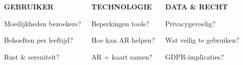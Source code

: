 \documentclass[final]{beamer}
\begin{document}
\begin{frame}[t]{}
\begin{columns}[T, totalwidth=\linewidth]
            \begin{columns}[T, totalwidth=\linewidth]
                \begin{tcolorbox}[subqbox]
                    {\small\bfseries\color{hogentred}\MakeUppercase{Gebruiker}}\\[1.5mm]
                    \begin{dotlist}
                        \item[\small\color{hogentred}\textbullet] {\small Moeilijkheden bezoekers?}
                        \item[\small\color{hogentred}\textbullet] {\small Behoeften per leeftijd?}
                        \item[\small\color{hogentred}\textbullet] {\small Rust \& sereniteit?}
                    \end{dotlist}
                \end{tcolorbox}
                \begin{tcolorbox}[subqbox]
                    {\small\bfseries\color{hogentred}\MakeUppercase{Technologie}}\\[1.5mm]
                    \begin{dotlist}
                        \item[\small\color{hogentred}\textbullet] {\small Beperkingen tools?}
                        \item[\small\color{hogentred}\textbullet] {\small Hoe kan AR helpen?}
                        \item[\small\color{hogentred}\textbullet] {\small AR + kaart samen?}
                    \end{dotlist}
                \end{tcolorbox}
                \begin{tcolorbox}[subqbox]
                    {\small\bfseries\color{hogentred}\MakeUppercase{Data \& Recht}}\\[1.5mm]
                    \begin{dotlist}
                        \item[\small\color{hogentred}\textbullet] {\small Privacygevoelig?}
                        \item[\small\color{hogentred}\textbullet] {\small Wat veilig te gebruiken?}
                        \item[\small\color{hogentred}\textbullet] {\small GDPR-implicaties?}
                    \end{dotlist}
                \end{tcolorbox}
            \end{columns}
            

\end{columns}
\end{frame}
\end{document}
